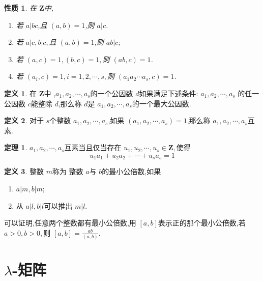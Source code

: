 \documentclass[a4paper,11pt]{article}%
\theoremstyle{remark}
\theoremstyle{definition}
\newtheorem{theorem}{定理}[section]
\theoremstyle{definition}
\newtheorem*{definition}{定义}
\theoremstyle{plain}
\newtheorem*{property}{性质}
\begin{document}
\begin{property}
    在 $\mathbf{Z}$中,
\begin{enumerate}
\item 若 $a|bc$,且 $(a,b)=1$,则 $a|c$.
\item 若 $a|c,b|c,$且 $(a,b)=1$,则 $ab|c$;
\item 若 $(a,c)=1,(b,c)=1,$则 $(ab,c)=1$.
\item 若 $(a_i,c)=1,i=1,2,\cdots,s,$则 $(a_1a_2\cdots a_s,c)=1$.
\end{enumerate}
\end{property}
\begin{definition}
    在 $\mathbf{Z}$中 ,$a_1,a_2,\cdots,a_s$的一个公因数 $d$如果满足下述条件: $a_1,a_2,\cdots,a_s$
    的任一公因数 $c$能整除 $d$,那么称 $d$是 $a_1,a_2,\cdots,a_s$的一个最大公因数.
\end{definition}
\begin{definition}
    对于 $s$个整数 $a_1,a_2,\cdots,a_s$,如果 $(a_1,a_2,\cdots,a_s)=1$,那么称 $a_1,a_2,\cdots,a_s$互素.
\end{definition}
\begin{theorem}
    $a_1,a_2,\cdots,a_s$互素当且仅当存在 $u_1,u_2,\cdots,u_s\in \mathbf{Z},$使得
    \[u_1a_1+u_2a_2+\cdots+u_sa_s=1\]
\end{theorem}
\begin{definition}
    整数 $m$称为 整数 $a$与 $b$的最小公倍数,如果 
    \begin{enumerate}
        \item $a|m,b|m$;
        \item 从 $a|l,b|l$可以推出 $m|l$.
    \end{enumerate}
\end{definition}
可以证明,任意两个整数都有最小公倍数,用 $[a,b]$表示正的那个最小公倍数,若 $a>0,b>0,$则
$[a,b]=\frac{ab}{(a,b)}.$
\section{$\lambda$-矩阵}
\end{document}
